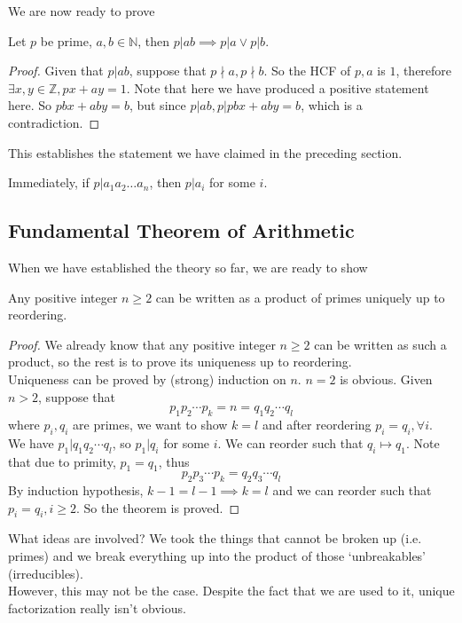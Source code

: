 We are now ready to prove
\begin{proposition}
    Let $p$ be prime, $a,b\in\mathbb N$, then $p|ab\implies p|a\lor p|b$.
\end{proposition}
\begin{proof}
    Given that $p|ab$, suppose that $p\nmid a,p\nmid b$.
    So the HCF of $p,a$ is $1$, therefore $\exists x,y\in\mathbb Z, px+ay=1$.
    Note that here we have produced a positive statement here.
    So $pbx+aby=b$, but since $p|ab,p|pbx+aby=b$, which is a contradiction.
\end{proof}
This establishes the statement we have claimed in the preceding section.
\begin{remark}
    Immediately, if $p|a_1a_2\ldots a_n$, then $p|a_i$ for some $i$.
\end{remark}
\subsection{Fundamental Theorem of Arithmetic}
When we have established the theory so far, we are ready to show
\begin{theorem}
    Any positive integer $n\ge 2$ can be written as a product of primes uniquely up to reordering.
\end{theorem}
\begin{proof}
    We already know that any positive integer $n\ge 2$ can be written as such a product, so the rest is to prove its uniqueness up to reordering.\\
    Uniqueness can be proved by (strong) induction on $n$. $n=2$ is obvious.
    Given $n>2$, suppose that
    $$p_1p_2\cdots p_k=n=q_1q_2\cdots q_l$$
    where $p_i,q_i$ are primes, we want to show $k=l$ and after reordering $p_i=q_i,\forall i$.\\
    We have $p_1|q_1q_2\cdots q_l$, so $p_1|q_i$ for some $i$.
    We can reorder such that $q_i\mapsto q_1$.
    Note that due to primity, $p_1=q_1$, thus
    $$p_2p_3\cdots p_k=q_2q_3\cdots q_l$$
    By induction hypothesis, $k-1=l-1\implies k=l$ and we can reorder such that $p_i=q_i, i\ge 2$.
    So the theorem is proved. 
\end{proof}
What ideas are involved?
We took the things that cannot be broken up (i.e. primes) and we break everything up into the product of those `unbreakables' (irreducibles).\\
However, this may not be the case.
Despite the fact that we are used to it, unique factorization really isn't obvious.
